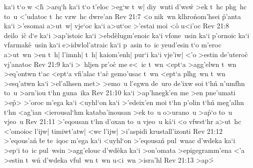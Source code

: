 ka`i
t`o
w
<h\r{}
>arq`h
ka`i
t`o
t'eloc
>eg`w
t~w|
diy~wnti
d'ws\r{w}
>ek
t~hc
phg~hc
to~u
<'udatoc
t~hc
vzw~hc
dwre'an\bibvsend
\vs Rev 21:7
<o
nik~wn
klhro\r{n}om'hsei
\r{p}'anta
ka`i
>'esomai
a>ut~w|
vje`oc
ka`i
a>ut`oc
>'estai
moi
<o\r{}
u<i'oc\bibvsend
\vs Rev 21:8
deilo~ic\r{}
d`e
ka`i
>ap'istoic
ka`i
>ebd\r{e}lugm'enoic
ka`i
vfone~usin
ka`i
p'ornoic
ka`i
vfarmak\r{e}~usin
ka`i
e>idwlol'atraic
ka`i
p~asin
to~ic
yeud'esin
t`o
m'eroc
a>ut~wn
>en
t~h|
l'imnh|
t~h|
kaiom'enh|
pur`i
ka`i
vje'iw|
<'o
>estin
de'uteroc\r{}
vj'anatoc\bibvsend
\vs Rev 21:9
ka`i
>~hljen
pr'oc\r{}
me
e<~ic
t~wn
<ept`a
>agg'elwn
t~wn
>eq'ontwn
t`ac
<ept`a
vfi'alac
t`ac\r{}
gemo'usac
t~wn
<ept`a
plhg~wn
t~wn
>esq'atwn
ka`i
>el'alhsen
met>
>emo~u
l'egwn
de~uro
de'ixw
soi
t`hn\r{}
n'umfhn
to~u
>arn'iou
t`hn
guna~ika\bibvsend
\vs Rev 21:10
ka`i
>ap'hnegk'en
me
>en
pne'umati
>e\r{p}>
>'oroc
m'ega
ka`i
<uyhl`on
ka`i
>'edeix'en
moi
t`hn
p'olin
t`hn\r{}
meg'alhn
t`hn
<ag'ian
<ierousal`hm
kataba'inousan
>ek
to~u
o>urano~u
>a\r{p}`o
to~u
vjeo~u\bibvsend
\vs Rev 21:11
>'eqousan
t`hn
d'oxan
to~u
vjeo~u
k\r{a}`i
<o
vfwst`hr
a>ut~hc
<'omoioc
l'ijw|
timiwt'atw|
<wc
l'ijw|
>i'aspidi
krustall'izonti\bibvsend
\vs Rev 21:12
>'eqous'a\r{n}
\r{t}e
te~iqoc
m'ega
ka`i
<uyhl`on
>'eqousa\r{n}
pul~wnac
d'wdeka
ka`i
>ep`i
to~ic
pul~wsin
>agg'elouc
d'wd\r{e}ka
ka`i
>on'omata
>epigegramm'ena
<'a
>estin
t~wn\r{}
d'wdeka
vful~wn
t~wn
u<i~wn
>isra'hl\bibvsend
\vs Rev 21:13
>ap>\r{}

